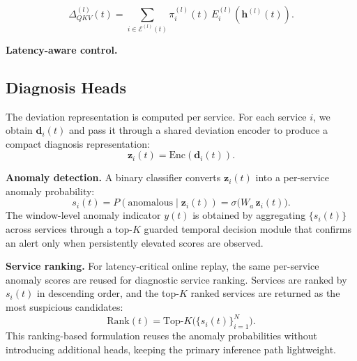 \begin{equation}
\Delta^{(l)}_{QKV}(t) = \sum_{i \in \mathcal{E}^{(l)}(t)} \pi_i^{(l)}(t) \, E_i^{(l)}(\mathbf{h}^{(l)}(t)).
\end{equation}

\textbf{Latency-aware control.}
\subsection{Diagnosis Heads}

The deviation representation is computed per service. For each service $i$, we obtain $\mathbf{d}_i(t)$ and pass it through a shared deviation encoder to produce a compact diagnosis representation:
\begin{equation}
\mathbf{z}_i(t) = \text{Enc}(\mathbf{d}_i(t)).
\end{equation}

\textbf{Anomaly detection.}
A binary classifier converts $\mathbf{z}_i(t)$ into a per-service anomaly probability:
\begin{equation}
s_i(t) = P(\text{anomalous} \mid \mathbf{z}_i(t)) = \sigma\bigl(W_a \, \mathbf{z}_i(t)\bigr).
\end{equation}
The window-level anomaly indicator $y(t)$ is obtained by aggregating $\{s_i(t)\}$ across services through a top-$K$ guarded temporal decision module that confirms an alert only when persistently elevated scores are observed.

\textbf{Service ranking.}
For latency-critical online replay, the same per-service anomaly scores are reused for diagnostic service ranking. Services are ranked by $s_i(t)$ in descending order, and the top-$K$ ranked services are returned as the most suspicious candidates:
\begin{equation}
\text{Rank}(t) = \text{Top-}K\bigl(\{s_i(t)\}_{i=1}^{N}\bigr).
\end{equation}
This ranking-based formulation reuses the anomaly probabilities without introducing additional heads, keeping the primary inference path lightweight.

